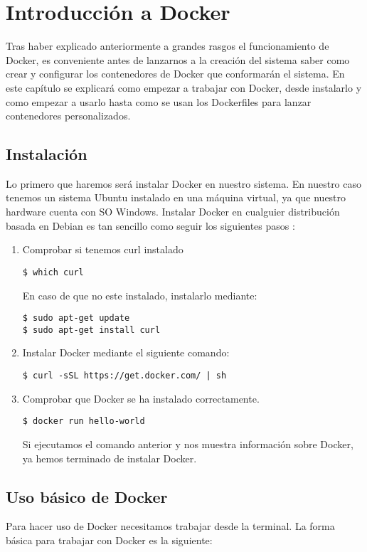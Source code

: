 \chapter{Introducción a Docker}
Tras haber explicado anteriormente a grandes rasgos el funcionamiento de Docker, es conveniente antes de lanzarnos a la creación del sistema saber como crear y configurar los contenedores de Docker que conformarán el sistema. En este capítulo se explicará como empezar a trabajar con Docker, desde instalarlo y como empezar a usarlo hasta como se usan los Dockerfiles para lanzar contenedores personalizados.

	\section{Instalación}
	Lo primero que haremos será instalar Docker en nuestro sistema. En nuestro caso tenemos un sistema Ubuntu instalado en una máquina virtual, ya que nuestro hardware cuenta con SO Windows. Instalar Docker en cualguier distribución basada en Debian es tan sencillo como seguir los siguientes pasos \cite{docker-install}:
	
	\lstset{language=bash, breaklines=true, basicstyle=\footnotesize}
	\begin{enumerate}
		\item Comprobar si tenemos curl instalado
		\begin{lstlisting}[style=consola]
$ which curl
		\end{lstlisting}
		En caso de que no este instalado, instalarlo mediante:
		\begin{lstlisting}[style=consola]
$ sudo apt-get update
$ sudo apt-get install curl
		\end{lstlisting}
		\item Instalar Docker mediante el siguiente comando:
		\begin{lstlisting}[style=consola]
$ curl -sSL https://get.docker.com/ | sh
		\end{lstlisting}
		\item Comprobar que Docker se ha instalado correctamente.
		\begin{lstlisting}[style=consola]
$ docker run hello-world
		\end{lstlisting}
			Si ejecutamos el comando anterior y nos muestra información sobre Docker, ya hemos terminado de instalar Docker.
	\end{enumerate}
	
	\section{Uso básico de Docker}
	Para hacer uso de Docker necesitamos trabajar desde la terminal. La forma básica para trabajar con Docker es la siguiente:
	
